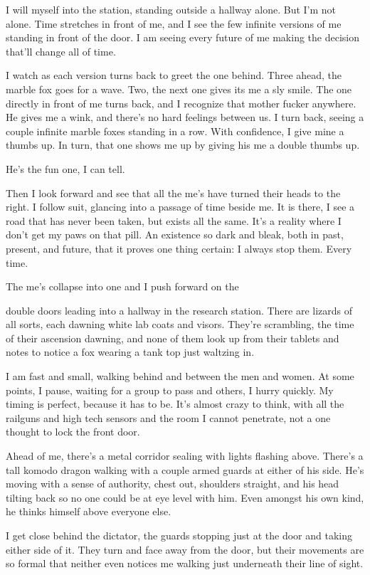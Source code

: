 I will myself into the station, standing outside a hallway alone. But
I'm not alone. Time stretches in front of me, and I see the few infinite
versions of me standing in front of the door. I am seeing every future
of me making the decision that'll change all of time.

I watch as each version turns back to greet the one behind. Three ahead,
the marble fox goes for a wave. Two, the next one gives its me a sly
smile. The one directly in front of me turns back, and I recognize that
mother fucker anywhere. He gives me a wink, and there's no hard feelings
between us. I turn back, seeing a couple infinite marble foxes standing
in a row. With confidence, I give mine a thumbs up. In turn, that one
shows me up by giving his me a double thumbs up.

He's the fun one, I can tell.

Then I look forward and see that all the me's have turned their heads to
the right. I follow suit, glancing into a passage of time beside me. It
is there, I see a road that has never been taken, but exists all the
same. It's a reality where I don't get my paws on that pill. An
existence so dark and bleak, both in past, present, and future, that it
proves one thing certain: I always stop them. Every time.

The me's collapse into one and I push forward on the

double doors leading into a hallway in the research station. There are
lizards of all sorts, each dawning white lab coats and visors. They're
scrambling, the time of their ascension dawning, and none of them look
up from their tablets and notes to notice a fox wearing a tank top just
waltzing in.

I am fast and small, walking behind and between the men and women. At
some points, I pause, waiting for a group to pass and others, I hurry
quickly. My timing is perfect, because it has to be. It's almost crazy
to think, with all the railguns and high tech sensors and the room I
cannot penetrate, not a one thought to lock the front door.

Ahead of me, there's a metal corridor sealing with lights flashing
above. There's a tall komodo dragon walking with a couple armed guards
at either of his side. He's moving with a sense of authority, chest out,
shoulders straight, and his head tilting back so no one could be at eye
level with him. Even amongst his own kind, he thinks himself above
everyone else.

I get close behind the dictator, the guards stopping just at the door
and taking either side of it. They turn and face away from the door, but
their movements are so formal that neither even notices me walking just
underneath their line of sight.

